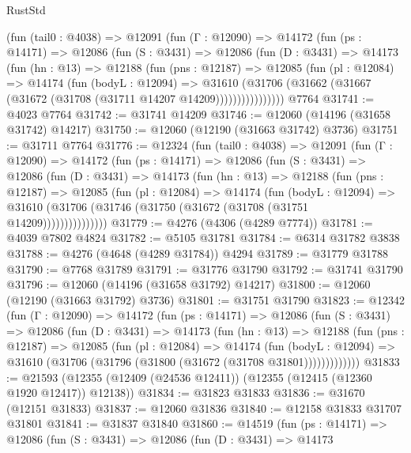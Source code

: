 \begin{lexlean}{RustStd}
\begin{coremodule}
      (fun (tail0 : @4038) =>
      @12091
        (fun (Γ : @12090) =>
        @14172
          (fun (ps : @14171) =>
          @12086
            (fun (S : @3431) =>
            @12086
              (fun (D : @3431) =>
              @14173
                (fun (hn : @13) =>
                @12188
                  (fun (pns : @12187) =>
                  @12085
                    (fun (pl : @12084) =>
                    @14174
                      (fun (bodyL : @12094) =>
                      @31610
                        (@31706
                          (@31662 (@31667 (@31672 (@31708 (@31711 @14207 @14209))))))))))))))))
    @7764
@31741 := @4023 @7764
@31742 := @31741 @14209
@31746 := @12060 (@14196 (@31658 @31742) @14217)
@31750 := @12060 (@12190 (@31663 @31742) @3736)
@31751 := @31711 @7764
@31776 := @12324
    (fun (tail0 : @4038) =>
    @12091
      (fun (Γ : @12090) =>
      @14172
        (fun (ps : @14171) =>
        @12086
          (fun (S : @3431) =>
          @12086
            (fun (D : @3431) =>
            @14173
              (fun (hn : @13) =>
              @12188
                (fun (pns : @12187) =>
                @12085
                  (fun (pl : @12084) =>
                  @14174
                    (fun (bodyL : @12094) =>
                    @31610 (@31706 (@31746 (@31750 (@31672 (@31708 (@31751 @14209)))))))))))))))
@31779 := @4276 (@4306 (@4289 @7774))
@31781 := @4039 @7802 @4824
@31782 := @5105 @31781
@31784 := @6314 @31782 @3838
@31788 := @4276 (@4648 (@4289 @31784)) @4294
@31789 := @31779 @31788
@31790 := @7768 @31789
@31791 := @31776 @31790
@31792 := @31741 @31790
@31796 := @12060 (@14196 (@31658 @31792) @14217)
@31800 := @12060 (@12190 (@31663 @31792) @3736)
@31801 := @31751 @31790
@31823 := @12342
    (fun (Γ : @12090) =>
    @14172
      (fun (ps : @14171) =>
      @12086
        (fun (S : @3431) =>
        @12086
          (fun (D : @3431) =>
          @14173
            (fun (hn : @13) =>
            @12188
              (fun (pns : @12187) =>
              @12085
                (fun (pl : @12084) =>
                @14174
                  (fun (bodyL : @12094) =>
                  @31610 (@31706 (@31796 (@31800 (@31672 (@31708 @31801)))))))))))))
@31833 := @21593 (@12355 (@12409 (@24536 @12411)) (@12355 (@12415 (@12360 @1920 @12417)) @12138))
@31834 := @31823 @31833
@31836 := @31670 (@12151 @31833)
@31837 := @12060 @31836
@31840 := @12158 @31833 @31707 @31801
@31841 := @31837 @31840
@31860 := @14519
    (fun (ps : @14171) =>
    @12086
      (fun (S : @3431) =>
      @12086
        (fun (D : @3431) =>
        @14173

\end{coremodule}
\end{lexlean}
